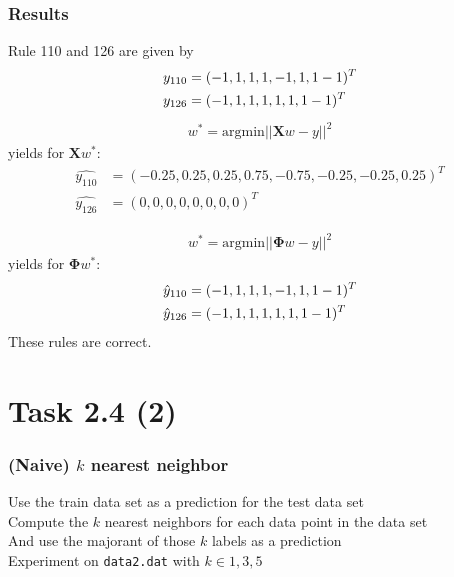 \documentclass{beamer}
\begin{document}
\begin{frame}
	\frametitle{Results}
	Rule 110 and 126 are given by
	\begin{align*}
		y_{110} &= (-1,1,1,1,-1,1,1-1)^T \\\bigskip
		y_{126} &=  (-1,1,1,1,1,1,1-1)^T
	\end{align*}
	\begin{align*}
	w^* = \text{argmin}||\mathbf{X} w - y||^2	
	\end{align*}
	yields for $\mathbf{X}w^*$:
	\begin{align*}
			\hat{y_{110}}&= (-0.25,  0.25,  0.25,  0.75, -0.75, -0.25, -0.25,  0.25)^T\\
			\hat{y_{126}}&= (0,0,0,0,0,0,0,0)^T
	\end{align*}
	
\end{frame}

\begin{frame}
	\begin{align*}
	w^* = \text{argmin}||\mathbf{\Phi} w - y||^2	
	\end{align*}
	yields for $\mathbf{\mathbf{\Phi}}w^*$:
	\begin{align*}
	\hat{y}_{110} &= (-1,1,1,1,-1,1,1-1)^T \\\bigskip
	\hat{y}_{126} &=  (-1,1,1,1,1,1,1-1)^T
	\end{align*}
	These rules are correct.
\end{frame}

\section{Task 2.4 (2)}

\begin{frame}
	\frametitle{(Naive) $k$ nearest neighbor}
	Use the train data set as a prediction for the test data set \\\medskip
	Compute the $k$ nearest neighbors for each data point in the data set \\\medskip
	And use the majorant of those $k$ labels as a prediction \\\medskip
	Experiment on \texttt{data2.dat} with $k \in {1,3,5}$
\end{frame}
\end{document}
